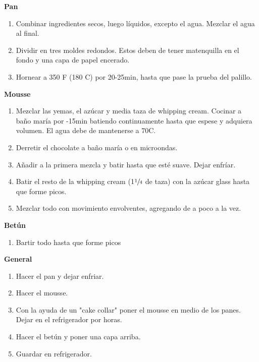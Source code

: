 \textbf{Pan}
\begin{enumerate}
\item Combinar ingredientes secos, luego líquidos, excepto el agua. Mezclar el agua al final.
\item Dividir en tres moldes redondos. Estos deben de tener matenquilla en el fondo y una capa de papel encerado.
\item Hornear a 350 F (180 C) por 20-25min, hasta que pase la prueba del palillo.
\end{enumerate}

\textbf{Mousse}
\begin{enumerate}
\item Mezclar las yemas, el azúcar y media taza de whipping cream. Cocinar a baño maría por -15min batiendo continuamente hasta que espese y adquiera volumen. El agua debe de mantenerse a \Sim 70C.
\item Derretir el chocolate a baño maría o en microondas.
\item Añadir a la primera mezcla y batir hasta que esté suave.  Dejar enfríar.
\item Batir el resto de la whipping cream (1$\sfrac{1}{4}$ de taza) con la azúcar glass hasta que forme picos.
\item Mezclar todo con movimiento envolventes, agregando de a poco a la vez.
\end{enumerate}

\textbf{Betún}
\begin{enumerate}
\item Bartir todo hasta que forme picos
\end{enumerate}

\textbf{General}
\begin{enumerate}
\item Hacer el pan y dejar enfriar.
\item Hacer el mousse.
\item Con la ayuda de un "cake collar" poner el mousse en medio de los panes. Dejar en el refrigerador por  horas.
\item Hacer el betún y poner una capa arriba.
\item Guardar en refrigerador.
\end{enumerate}